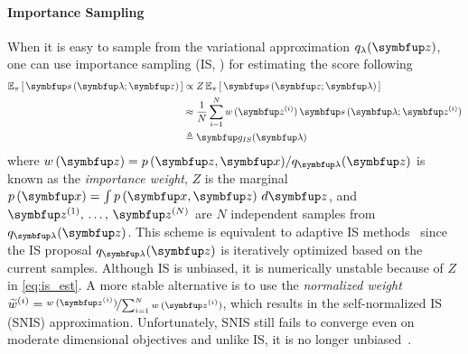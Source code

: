 \paragraph{Importance Sampling}
When it is easy to sample from the variational approximation \(q_{\lambda}(\vz)\), one can use importance sampling (IS, \citealt{robert_monte_2004}) for estimating the score following
\vspace{-0.05in}
\begin{align}
  \Esub{\pi}{ \vs\,(\vlambda;\vz) } 
  &\propto Z\,\Esub{\pi}{ \vs\,(\vz; \vlambda) } \label{eq:is_est} \\
  &\approx \frac{1}{N} \sum^{N}_{i=1} w\,(\vz^{(i)}) \, \vs\,(\vlambda; \vz^{(i)}) \\
  &\triangleq \vg_{IS}(\vlambda)
\end{align}
where \(w\,(\vz) = p\,(\vz,\vx) / q_{\vlambda}(\vz)\) is known as the \textit{importance weight}, \(Z\) is the marginal \(p\left(\vx\right) = \int p\left(\vx, \vz\right) \, d\vz\), and \(\vz^{(1)},\, \ldots,\, \vz^{(N)}\) are \(N\) independent samples from \(q_{\vlambda}(\vz)\).
This scheme is equivalent to adaptive IS methods~\citep{bugallo_adaptive_2017} since the IS proposal \(q_{\vlambda}(\vz)\) is iteratively optimized based on the current samples.
Although IS is unbiased, it is numerically unstable because of \(Z\) in \cref{eq:is_est}.
A more stable alternative is to use the \textit{normalized weight} \(\widetilde{w}^{(i)} = \nicefrac{w\,(\vz^{(i)})}{\sum_{i=1}^N w\,(\vz^{(i)}) }\), which results in the self-normalized IS (SNIS) approximation.
Unfortunately, SNIS still fails to converge even on moderate dimensional objectives and unlike IS, it is no longer unbiased~\citep{robert_monte_2004}.


